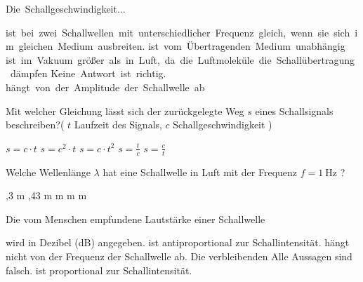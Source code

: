 \documentclass[11pt]{exam}
\begin{document}
\setlength{\voffset}{-0.5in}
\setlength{\headsep}{5pt}

\hspace{2mm}
 \hspace{5mm}
\vspace{4mm}

\begin{questions}

\question Die Schallgeschwindigkeit...

\begin{choices}
	\choice ist bei zwei Schallwellen mit unterschiedlicher Frequenz gleich, wenn sie sich im gleichen Medium ausbreiten.
	\choice ist vom Übertragenden Medium unabhängig
	\choice ist im Vakuum größer als in Luft, da die Luftmoleküle die Schallübertragung dämpfen
	\choice Keine Antwort ist richtig.
	\choice hängt von der Amplitude der Schallwelle ab
\end{choices}

\vspace{3mm}\question Mit welcher Gleichung lässt sich der zurückgelegte Weg \( s \) eines Schallsignals beschreiben?( \( t \) Laufzeit des Signals, \( c \) Schallgeschwindigkeit )

\begin{choices}
	\choice \( s=c \cdot t \)
	\choice \( s=c^2 \cdot t \)
	\choice \( s = c \cdot t^2 \)
	\choice \( s= \frac{t}{c} \)
	\choice \( s= \frac{c}{t} \)
\end{choices}

\vspace{3mm}\question Welche Wellenlänge \( \lambda \) hat eine Schallwelle in Luft mit der Frequenz \( f = \mathrm{1~Hz} \) ?

\begin{choices}
	,3 m
	,43 m
	 m
	 m
	 m
\end{choices}

\vspace{3mm}\question Die vom Menschen empfundene Lautstärke einer Schallwelle

\begin{choices}
	\choice wird in Dezibel (dB) angegeben.
	\choice ist antiproportional zur Schallintensität.
	\choice hängt nicht von der Frequenz der Schallwelle ab.
	\choice Die verbleibenden Alle Aussagen sind falsch.
	\choice ist proportional zur Schallintensität.
\end{choices}


\end{questions}
\end{document}
